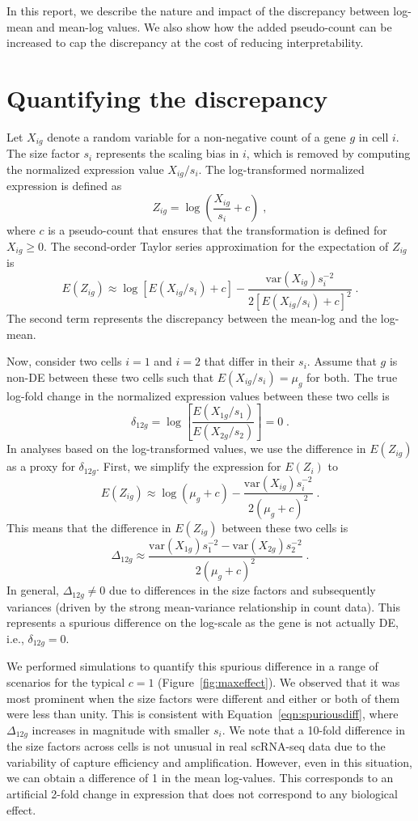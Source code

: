 \documentclass[10pt,letterpaper]{article}
\begin{document}
In this report, we describe the nature and impact of the discrepancy between log-mean and mean-log values.
We also show how the added pseudo-count can be increased to cap the discrepancy at the cost of reducing interpretability.

\section{Quantifying the discrepancy}
Let $X_{ig}$ denote a random variable for a non-negative count of a gene $g$ in cell $i$.
The size factor $s_i$ represents the scaling bias in $i$, which is removed by computing the normalized expression value $X_{ig}/s_i$.
The log-transformed normalized expression is defined as 
\[
Z_{ig} = \log\left(\frac{X_{ig}}{s_i}+ c\right) \;,
\]
where $c$ is a pseudo-count that ensures that the transformation is defined for $X_{ig} \ge 0$.
The second-order Taylor series approximation for the expectation of $Z_{ig}$ is
\[
E(Z_{ig}) \approx \log[E(X_{ig}/s_i) + c] - \frac{\mbox{var}(X_{ig})s_i^{-2}}{2[E(X_{ig}/s_i) + c]^2} \;.
\]
The second term represents the discrepancy between the mean-log and the log-mean.

Now, consider two cells $i=1$ and $i=2$ that differ in their $s_i$.
Assume that $g$ is non-DE between these two cells such that $E(X_{ig}/s_i)=\mu_g$ for both.
The true log-fold change in the normalized expression values between these two cells is
\[
\delta_{12g} = \log\left[ \frac{E(X_{1g}/s_1)}{E(X_{2g}/s_2)} \right] = 0 \;.
\]
In analyses based on the log-transformed values, we use the difference in $E(Z_{ig})$ as a proxy for $\delta_{12g}$.
First, we simplify the expression for $E(Z_i)$ to
\[
E(Z_{ig}) \approx \log(\mu_g + c) - \frac{\mbox{var}(X_{ig})s_i^{-2}}{2(\mu_g + c)^2} \;.
\]
This means that the difference in $E(Z_{ig})$ between these two cells is 
\begin{equation}
\Delta_{12g} \approx \frac{\mbox{var}(X_{1g})s_1^{-2} -  \mbox{var}(X_{2g})s_2^{-2}}{2(\mu_g + c)^2} \;. \label{eqn:spuriousdiff}
\end{equation}
In general, $\Delta_{12g} \neq 0$ due to differences in the size factors and subsequently variances (driven by the strong mean-variance relationship in count data).
This represents a spurious difference on the log-scale as the gene is not actually DE, i.e., $\delta_{12g}=0$.

We performed simulations to quantify this spurious difference in a range of scenarios for the typical $c=1$ (Figure~\ref{fig:maxeffect}).
We observed that it was most prominent when the size factors were different and either or both of them were less than unity.
This is consistent with Equation~\ref{eqn:spuriousdiff}, where $\Delta_{12g}$ increases in magnitude with smaller $s_i$.
We note that a 10-fold difference in the size factors across cells is not unusual in real scRNA-seq data \cite{lun2016pooling} due to the variability of capture efficiency and amplification.
However, even in this situation, we can obtain a difference of 1 in the mean log-values.
This corresponds to an artificial 2-fold change in expression that does not correspond to any biological effect.
\end{document}

